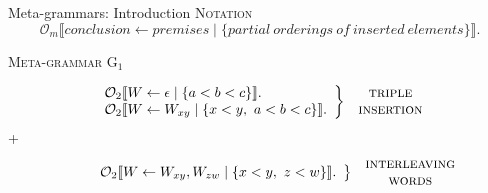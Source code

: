 \documentclass{beamer}
\newcommand{\Orderr}[5]{
	\mathcal{#1}_{#5}\llbracket #2 \leftarrow #3 \mid \{ #4 \} \rrbracket.
}
\newcommand{\Or}[4]{\Orderr{O}{#1}{#2}{#3}{#4}}
\newcommand\tsc[1]{\alert{\textsc{#1}}}
\begin{document}
  	\begin{frame}{Meta-grammars: Introduction}
	  	\vspace{.7cm}
	  	\center \tsc{Notation}
  		\[
  			\Or{conclusion}{premises}{partial\ orderings\ of\ inserted\ elements}{m}
  		\]
  		\vspace{.1cm}
  		\pause
  		\begin{center}\tsc{Meta-grammar G$_1$}\end{center}
  		  \[ \left . \
  		  	\begin{array}{ll}
				\Or{W}{\epsilon}{a < b < c}{2} \\
               		\Or{W}{W_{xy}}{x < y,\ a < b < c}{2}
	           \end{array}
           	\right\} \
           	\begin{array}{c}
           		\textsc{triple} \\
	           	\textsc{insertion}
     		      \end{array}
		  \]
  		\pause
  		\hspace{-4cm} \textcolor{ggreen}{+} \vspace{-3mm}
  		\[ \left . \
  		   \hspace{.75cm}
  		   \begin{array}{ll}
		       \Or{W}{W_{xy}, W_{zw}}{x < y,\ z < w}{2}
         	   \end{array}
             \right\} \
             \begin{array}{c}
         		  \textsc{interleaving} \\
           	  \textsc{words}
	        \end{array}
		\]
  		\vspace{.7cm}
  	\end{frame}
\end{document}
